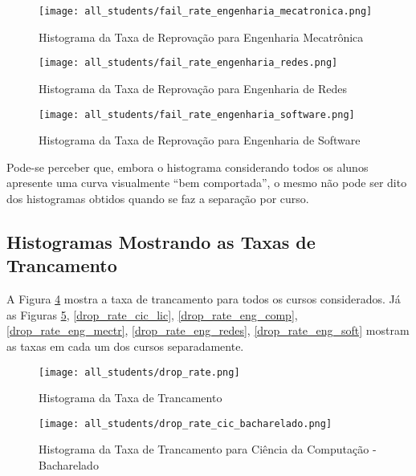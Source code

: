 \begin{figure}[!ht]
    \caption{Histograma da Taxa de Reprovação para Engenharia Mecatrônica}
    \centering
    \texttt{[image: all\_students/fail\_rate\_engenharia\_mecatronica.png]}
    \label{fail_rate_eng_mectr}
\end{figure}

\begin{figure}[!ht]
    \caption{Histograma da Taxa de Reprovação para Engenharia de Redes}
    \centering
    \texttt{[image: all\_students/fail\_rate\_engenharia\_redes.png]}
    \label{fail_rate_eng_redes}
\end{figure}

\begin{figure}[!ht]
    \caption{Histograma da Taxa de Reprovação para Engenharia de Software}
    \centering
    \texttt{[image: all\_students/fail\_rate\_engenharia\_software.png]}
    \label{fail_rate_eng_soft}
\end{figure}

Pode-se perceber que, embora o histograma considerando todos os alunos apresente uma
curva visualmente ``bem comportada'', o mesmo não pode ser dito dos histogramas
obtidos
quando se faz a separação por curso.  

\clearpage

\subsection{Histogramas Mostrando as Taxas de Trancamento}
A Figura \ref{drop_rate_all} mostra a taxa de trancamento para todos os cursos
considerados. 
Já as Figuras \ref{drop_rate_cic_b}, \ref{drop_rate_cic_lic},
\ref{drop_rate_eng_comp}, \ref{drop_rate_eng_mectr}, \ref{drop_rate_eng_redes},
\ref{drop_rate_eng_soft} mostram as taxas em cada um dos cursos separadamente. 

\begin{figure}[!ht]
    \caption{Histograma da Taxa de Trancamento}
    \centering
    \texttt{[image: all\_students/drop\_rate.png]}
    \label{drop_rate_all}
\end{figure}

\begin{figure}[!ht]
    \caption{Histograma da Taxa de Trancamento para Ciência da Computação - Bacharelado}
    \centering
    \texttt{[image: all\_students/drop\_rate\_cic\_bacharelado.png]}
    \label{drop_rate_cic_b}
\end{figure}

